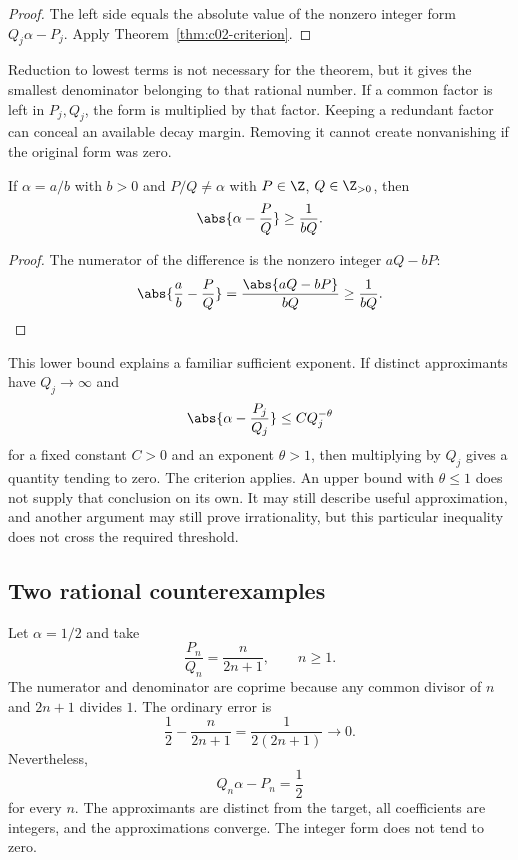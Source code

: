 \begin{proof}
The left side equals the absolute value of the nonzero integer form $Q_j\alpha-P_j$. Apply Theorem~\ref{thm:c02-criterion}.
\end{proof}

Reduction to lowest terms is not necessary for the theorem, but it gives the smallest denominator belonging to that rational number. If a common factor is left in $P_j,Q_j$, the form is multiplied by that factor. Keeping a redundant factor can conceal an available decay margin. Removing it cannot create nonvanishing if the original form was zero.

\begin{proposition}
\label{prop:c02-rational-distance}
If $\alpha=a/b$ with $b>0$ and $P/Q\ne\alpha$ with $P\in\Z$, $Q\in\Z_{>0}$, then
\begin{equation}
\abs{\alpha-\frac PQ}\geq\frac1{bQ}.
\label{eq:c02-rational-distance}
\end{equation}
\end{proposition}

\begin{proof}
The numerator of the difference is the nonzero integer $aQ-bP$:
\[
\abs{\frac ab-\frac PQ}=\frac{\abs{aQ-bP}}{bQ}\geq\frac1{bQ}.
\]
\end{proof}

This lower bound explains a familiar sufficient exponent. If distinct approximants have $Q_j\to\infty$ and
\begin{equation}
\abs{\alpha-\frac{P_j}{Q_j}}\leq C Q_j^{-\theta}
\label{eq:c02-exponent-bound}
\end{equation}
for a fixed constant $C>0$ and an exponent $\theta>1$, then multiplying by $Q_j$ gives a quantity tending to zero. The criterion applies. An upper bound with $\theta\leq1$ does not supply that conclusion on its own. It may still describe useful approximation, and another argument may still prove irrationality, but this particular inequality does not cross the required threshold.

\subsection{Two rational counterexamples}

\begin{example}
\label{ex:c02-linear-rational}
Let $\alpha=1/2$ and take
\[
\frac{P_n}{Q_n}=\frac{n}{2n+1},\qquad n\geq1.
\]
The numerator and denominator are coprime because any common divisor of $n$ and $2n+1$ divides $1$. The ordinary error is
\[
\frac12-\frac{n}{2n+1}=\frac1{2(2n+1)}\longrightarrow0.
\]
Nevertheless,
\[
Q_n\alpha-P_n=\frac12
\]
for every $n$. The approximants are distinct from the target, all coefficients are integers, and the approximations converge. The integer form does not tend to zero.
\end{example}


